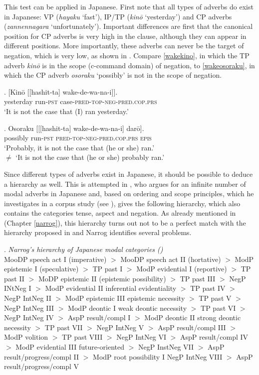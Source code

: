 \documentclass [output=book,colorlinks,citecolor=brown]{langscibook}
\begin{document}
This test can be applied in Japanese. First note that all types of adverbs do exist in Japanese: VP (\textit{hayaku} `fast'), IP/TP (\textit{kinō} `yesterday') and CP adverbs (\textit{zannennagara} `unfortunately’). Important differences are first that the canonical position for CP adverbs is very high in the clause, although they can appear in different positions. More importantly, these adverbs can never be the target of negation, which is very low, as shown in \citet{koizumi:2017:subject}. Compare \ref{wakekino}, in which the TP adverb \textit{kinō} is in the scope (c-command domain) of negation, to \ref{wakeosoraku}, in which the CP adverb \textit{osoraku} `possibly’ is not in the scope of negation. %

\exg. [Kinō [[hashit-ta] wake-de-wa-na-i]].\\
yesterday run-\textsc{pst} case-\textsc{pred-top-neg-pred.cop.prs}\\
`It is not the case that (I) ran yesterday.’ \label{wakekino}

\exg. Osoraku [[[hashit-ta] wake-de-wa-na-i] darō].\\
possibly run-\textsc{pst} \textsc{pred-top-neg-pred.cop.prs} \textsc{epis}\\
`Probably, it is not the case that (he or she) ran.’\\
$\neq$ `It is not the case that (he or she) probably ran.’ \\ \null \hfill \citep[556]{koizumi:2017:subject} \label{wakeosoraku}

Since different types of adverbs exist in Japanese, it should be possible to deduce a hierarchy as well. This is attempted in \citet{narrog:2009:mod}, who argues for an infinite number of modal adverbs in Japanese and, based on ordering and scope principles, which he investigates in a corpus study (see \citealt[71–76]{narrog:2009:mod}), gives the following hierarchy, which also contains the categories tense, aspect and negation. As already mentioned in (Chapter \ref{narrog}), this hierarchy turns out not to be a perfect match with the hierarchy proposed in \citet{cinque:1999:adverbs} and Narrog identifies several problems. %

\ex. \emph {Narrog's hierarchy of Japanese modal categories (\citealt[235]{narrog:2009:mod})}\\
MooDP speech act I (imperative) $>$ MooDP speech act II (hortative) $>$ ModP epistemic I (speculative) $>$ TP past I $>$ ModP evidential I (reportive) $>$ TP past II $>$ MoDP epistemic II (epistemic possibility) $>$ TP past III $>$ NegP INtNeg I $>$ ModP evidential II inferential evidentiality $>$ TP past IV $>$ NegP IntNeg II $>$ ModP epistemic III epistemic necessity $>$ TP past V $>$ NegP IntNeg III $>$ ModP deontic I weak deontic necessity $>$ TP past VI $>$ NegP IntNeg IV $>$ AspP result/compl I $>$ ModP deontic II strong deontic necessity $>$ TP past VII $>$ NegP IntNeg V $>$ AspP result/compl III $>$ ModP volition $>$ TP past VIII $>$ NegP IntNeg VI $>$ AspP result/compl IV $>$ ModP evidential III future-oriented $>$ NegP InstNeg VII $>$ AspP result/progress/compl II $>$ ModP root possibility I NegP IntNeg VIII $>$ AspP result/progress/compl V
\end{document}
